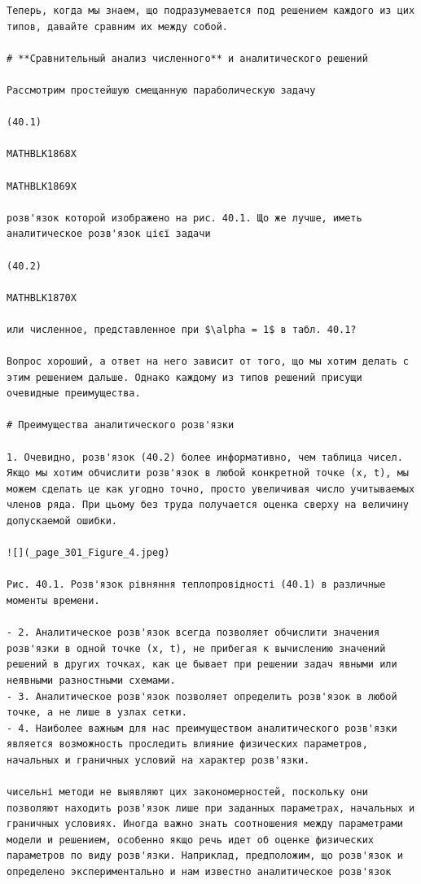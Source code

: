 \documentclass[
  ukrainian,
]{article}
\begin{document}
\begin{verbatim}
Теперь, когда мы знаем, що подразумевается под решением каждого из цих типов, давайте сравним их между собой.

# **Сравнительный анализ численного** и аналитического решений

Рассмотрим простейшую смещанную параболическую задачу

(40.1) 

MATHBLK1868X

MATHBLK1869X

розв'язок которой изображено на рис. 40.1. Що же лучше, иметь аналитическое розв'язок цієї задачи

(40.2) 

MATHBLK1870X

или численное, представленное при $\alpha = 1$ в табл. 40.1?

Вопрос хороший, а ответ на него зависит от того, що мы хотим делать с этим решением дальше. Однако каждому из типов решений присущи очевидные преимущества.

# Преимущества аналитического розв'язки

1. Очевидно, розв'язок (40.2) более информативно, чем таблица чисел. Якщо мы хотим обчислити розв'язок в любой конкретной точке (x, t), мы можем сделать це как угодно точно, просто увеличивая число учитываемых членов ряда. При цьому без труда получается оценка сверху на величину допускаемой ошибки.

![](_page_301_Figure_4.jpeg)

Рис. 40.1. Розв'язок рівняння теплопровідності (40.1) в различные моменты времени.

- 2. Аналитическое розв'язок всегда позволяет обчислити значения розв'язки в одной точке (x, t), не прибегая к вычислению значений решений в других точках, как це бывает при решении задач явными или неявными разностными схемами.
- 3. Аналитическое розв'язок позволяет определить розв'язок в любой точке, а не лише в узлах сетки.
- 4. Наиболее важным для нас преимуществом аналитического розв'язки является возможность проследить влияние физических параметров, начальных и граничных условий на характер розв'язки.

чисельні методи не выявляют цих закономерностей, поскольку они позволяют находить розв'язок лише при заданных параметрах, начальных и граничных условиях. Иногда важно знать соотношения между параметрами модели и решением, особенно якщо речь идет об оценке физических параметров по виду розв'язки. Наприклад, предположим, що розв'язок и определено экспериментально и нам известно аналитическое розв'язок


\end{verbatim}
\end{document}
